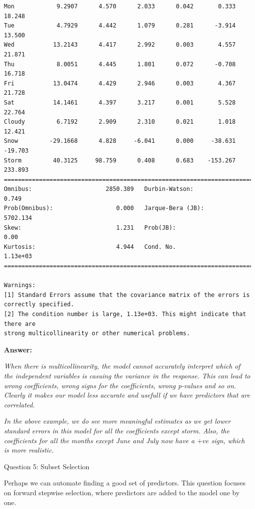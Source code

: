 \documentclass[11pt]{article}
\begin{document}
\begin{Verbatim}[commandchars=\\\{\}]
Mon            9.2907      4.570      2.033      0.042       0.333      18.248
Tue            4.7929      4.442      1.079      0.281      -3.914      13.500
Wed           13.2143      4.417      2.992      0.003       4.557      21.871
Thu            8.0051      4.445      1.801      0.072      -0.708      16.718
Fri           13.0474      4.429      2.946      0.003       4.367      21.728
Sat           14.1461      4.397      3.217      0.001       5.528      22.764
Cloudy         6.7192      2.909      2.310      0.021       1.018      12.421
Snow         -29.1668      4.828     -6.041      0.000     -38.631     -19.703
Storm         40.3125     98.759      0.408      0.683    -153.267     233.893
==============================================================================
Omnibus:                     2850.389   Durbin-Watson:                   0.749
Prob(Omnibus):                  0.000   Jarque-Bera (JB):             5702.134
Skew:                           1.231   Prob(JB):                         0.00
Kurtosis:                       4.944   Cond. No.                     1.13e+03
==============================================================================

Warnings:
[1] Standard Errors assume that the covariance matrix of the errors is correctly specified.
[2] The condition number is large, 1.13e+03. This might indicate that there are
strong multicollinearity or other numerical problems.

    \end{Verbatim}

    \textbf{Answer:}

\emph{When there is multicollinearity, the model cannot accurately
interpret which of the independent variables is casuing the variance in
the response. This can lead to wrong coefficients, wrong signs for the
coefficients, wrong p-values and so on. Clearly it makes our model less
accurate and usefull if we have predictors that are correlated.}

\emph{In the above example, we do see more meaningful estimates as we
get lower standard errors in this model for all the coefficients except
storm. Also, the coefficients for all the months except June and July
now have a \(+ve\) sign, which is more realistic.}

     Question 5: Subset Selection

Perhaps we can automate finding a good set of predictors. This question
focuses on forward stepwise selection, where predictors are added to the
model one by one.
\end{document}
